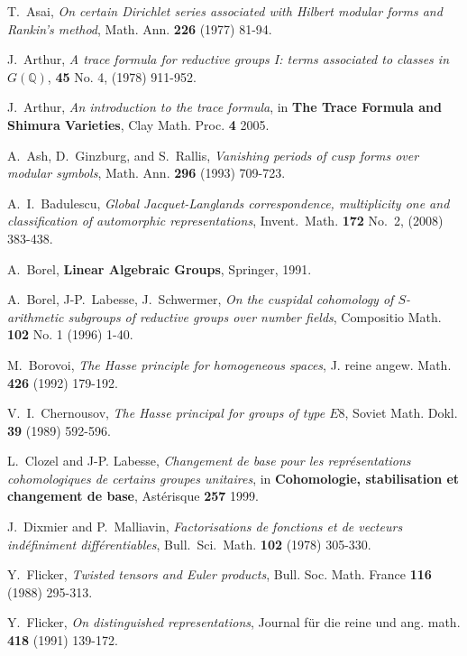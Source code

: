 \documentclass[12pt]{amsart}
\theoremstyle{remark}
\numberwithin{equation}{section}
\newcommand{\QQ}{\mathbb{Q}}
\theoremstyle{definition}
\numberwithin{equation}{subsection}
\begin{document}
\begin{thebibliography}{}

 T.~Asai, \emph{On certain Dirichlet series associated with Hilbert modular forms and Rankin's method}, Math. Ann. {\bf 226} (1977) 81-94.

 J.~Arthur, \emph{A trace formula for reductive groups I: terms associated to classes in $G(\QQ)$}, {\bf 45} No. 4, (1978) 911-952.

 J.~Arthur, \emph{An introduction to the trace formula}, in \textbf{The Trace Formula and Shimura Varieties}, Clay Math. Proc. {\bf 4} 2005.

 A.~Ash, D.~Ginzburg, and S.~Rallis, \emph{Vanishing periods of cusp forms over modular symbols}, Math. Ann. {\bf 296}  (1993) 709-723.

 A.~I.~Badulescu, \emph{Global Jacquet-Langlands correspondence, multiplicity one and classification of automorphic representations}, Invent.~Math. {\bf 172} No.~2, (2008) 383-438.

 A.~Borel, \textbf{Linear Algebraic Groups},
Springer, 1991.

 A.~Borel, J-P.~Labesse, J.~Schwermer, \emph{On the cuspidal cohomology of $S$-arithmetic subgroups of
reductive groups over number fields}, Compositio Math. {\bf 102} No. 1 (1996) 1-40.

 M.~Borovoi, \emph{The Hasse principle for homogeneous spaces}, J. reine angew. Math. {\bf 426} (1992) 179-192.

 V.~I.~Chernousov, \emph{The Hasse principal for groups of type $E8$}, Soviet Math. Dokl. {\bf 39} (1989) 592-596.

 L.~Clozel and J-P. Labesse, \emph{Changement
de base pour les repr\'esentations cohomologiques de certains
groupes unitaires}, in \textbf{Cohomologie, stabilisation et
changement de base}, Ast\'erisque {\bf 257} 1999.

 J.~Dixmier and P.~Malliavin, \emph{Factorisations de fonctions et de vecteurs ind\'efiniment diff\'erentiables}, Bull.~Sci.~Math. {\bf 102} (1978) 305-330.

 Y.~Flicker, \emph{Twisted tensors and Euler products}, Bull. Soc. Math.
France {\bf 116} (1988) 295-313.

 Y.~Flicker, \emph{On distinguished representations}, Journal f\"ur die reine und ang. math. {\bf 418} (1991)  139-172.


\end{thebibliography}
\end{document}
